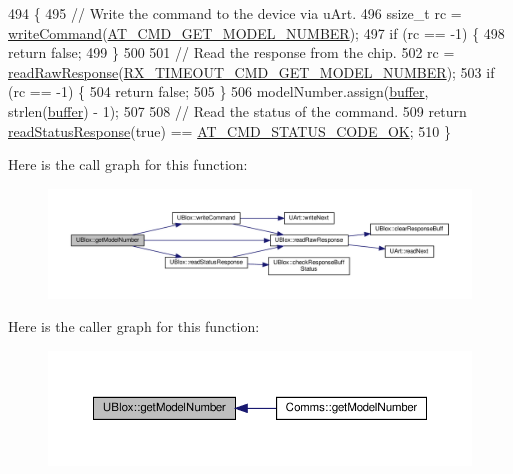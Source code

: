 \begin{DoxyCode}
494 \{
495     \textcolor{comment}{// Write the command to the device via uArt.}
496     ssize\_t rc = \hyperlink{class_u_blox_af604d1897a66192bf1c2a11997f2634d}{writeCommand}(\hyperlink{_u_blox_8cpp_ae8be964d0669627bf8fbd79040031222}{AT\_CMD\_GET\_MODEL\_NUMBER});
497     \textcolor{keywordflow}{if} (rc == -1) \{
498         \textcolor{keywordflow}{return} \textcolor{keyword}{false};
499     \}
500 
501     \textcolor{comment}{// Read the response from the chip.}
502     rc = \hyperlink{class_u_blox_ab4a7ab4b8922d91e23f273ae160c1bed}{readRawResponse}(\hyperlink{_u_blox_8cpp_a29c79801808a2dc36f093e853326396a}{RX\_TIMEOUT\_CMD\_GET\_MODEL\_NUMBER});
503     \textcolor{keywordflow}{if} (rc == -1) \{
504         \textcolor{keywordflow}{return} \textcolor{keyword}{false};
505     \}
506     modelNumber.assign(\hyperlink{class_u_blox_a6ca4b90f3dc4e856181dce1ebda6f82c}{buffer}, strlen(\hyperlink{class_u_blox_a6ca4b90f3dc4e856181dce1ebda6f82c}{buffer}) - 1);
507 
508     \textcolor{comment}{// Read the status of the command.}
509     \textcolor{keywordflow}{return} \hyperlink{class_u_blox_a4eaca5b1b1c4b5b6f6164b220dd43e0b}{readStatusResponse}(\textcolor{keyword}{true}) == \hyperlink{_u_blox_8cpp_a6ebc1682eb6b9964fccb4a61688ff307}{AT\_CMD\_STATUS\_CODE\_OK};
510 \}
\end{DoxyCode}
Here is the call graph for this function\+:
\nopagebreak
\begin{figure}[H]
\begin{center}
\leavevmode
\includegraphics[width=350pt]{da/df6/class_u_blox_ab9b9a03e10360c931686c1fe04af078d_cgraph}
\end{center}
\end{figure}
Here is the caller graph for this function\+:
\nopagebreak
\begin{figure}[H]
\begin{center}
\leavevmode
\includegraphics[width=350pt]{da/df6/class_u_blox_ab9b9a03e10360c931686c1fe04af078d_icgraph}
\end{center}
\end{figure}
\mbox{\label{class_u_blox_aee30d82dcf52335d19f77e766db78ab4}} 
